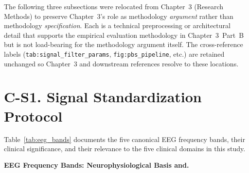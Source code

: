 \noindent The following three subsections were relocated from Chapter~3
(Research Methods) to preserve Chapter~3's role as methodology \emph{argument}
rather than methodology \emph{specification}. Each is a technical preprocessing
or architectural detail that supports the empirical evaluation methodology in
Chapter~3~Part~B but is not load-bearing for the methodology argument itself.
The cross-reference labels (\texttt{tab:signal\_\allowbreak filter\_\allowbreak params}, \texttt{fig:pbs\_\allowbreak pipeline},
etc.) are retained unchanged so Chapter~3 and downstream references resolve to
these locations.


\section*{C-S1. Signal Standardization Protocol}
\label{sec:appc_signal_std}

\iffalse %
Table~\ref{tab:eeg_bands} documents the five canonical EEG frequency bands, their clinical significance, and their relevance to the five clinical domains in this study.


\iffalse %
\noindent\textbf{EEG Frequency Bands: Neurophysiological Basis and.}

